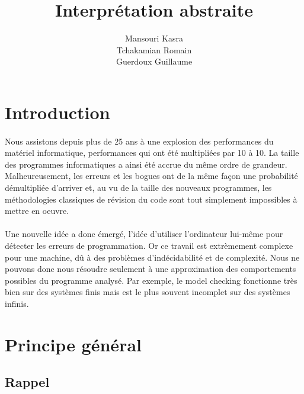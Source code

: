 \documentclass[french]{article}
\begin{document}
\title{Interprétation abstraite}

\author{Mansouri Kasra \\
        Tchakamian Romain \\
        Guerdoux Guillaume}

\maketitle


\section{Introduction}

\paragraph{}
Nous assistons depuis plus de 25 ans à une explosion des performances du matériel
informatique, performances qui ont été multipliées par 10 à 10. La taille des
programmes informatiques a ainsi été accrue du même ordre de grandeur.
Malheureusement, les erreurs et les bogues ont de la même façon une probabilité démultipliée
d'arriver et, au vu de la taille des nouveaux programmes, les méthodologies classiques de
révision du code sont tout simplement impossibles à mettre en oeuvre. \\

\paragraph{}
Une nouvelle idée a donc émergé, l'idée d'utiliser l'ordinateur lui-même pour détecter
les erreurs de programmation. Or ce travail est extrèmement complexe pour une machine, dû à des
problèmes d'indécidabilité et de complexité. Nous ne pouvons donc nous résoudre seulement à une approximation
des comportements possibles du programme analysé.
Par exemple, le model checking fonctionne très bien sur des systèmes finis mais est
le plus souvent incomplet sur des systèmes infinis.  \\

\section{Principe général}

\subsection{Rappel}
\end{document}
